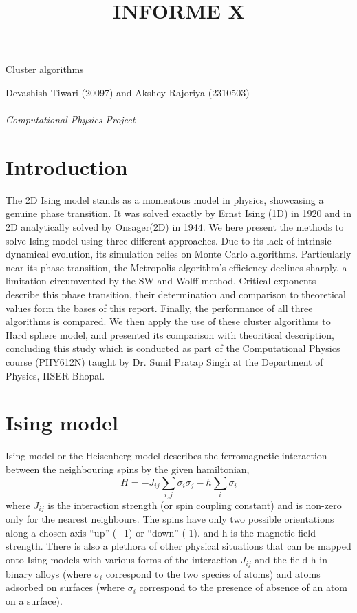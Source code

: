 \documentclass[a4paper,8pt]{article}
\title{INFORME X}
\begin{document}
\begin{center}
\Huge{Cluster algorithms}
\vspace{0.4cm}

\normalsize
\large{Devashish Tiwari (20097) and Akshey Rajoriya (2310503)} \\
\vspace{0.06cm}
\textit{\small{}\\
\large{Computational Physics Project}}\\
\small{}
\end{center}


\section{Introduction}

The 2D Ising model stands as a momentous model in physics, showcasing a genuine phase transition. It was solved exactly by Ernst Ising (1D) in 1920 and in 2D analytically solved by Onsager(2D) \supercite{PhysRev.65.117} in 1944. We here present the methods to solve Ising model using three different approaches. Due to its lack of intrinsic dynamical evolution, its simulation relies on Monte Carlo algorithms. Particularly near its phase transition, the Metropolis algorithm's efficiency declines sharply, a limitation circumvented by the SW and Wolff method. Critical exponents describe this phase transition, their determination and comparison to theoretical values form the bases of this report. Finally, the performance of all three algorithms is compared. We then apply the use of these cluster algorithms to Hard sphere model, and presented its comparison with theoritical description, concluding this study which is conducted as part of the Computational Physics course (PHY612N) taught by Dr. Sunil Pratap Singh at the Department of Physics, IISER Bhopal.


\section{Ising model}
Ising model or the Heisenberg model describes the ferromagnetic interaction between the neighbouring spins by the given hamiltonian,
\begin{equation}
    H = - J_{ij} \underset{i,j}{\sum} \sigma_{i} \sigma_{j} - h \underset{i}{\sum} \sigma_{i}
\end{equation}
where $J_{ij}$ is the interaction strength (or spin coupling constant) and is non-zero only for the nearest neighbours. The spins have only two possible orientations along a chosen axis \enquote{up} (+1) or \enquote{down} (-1). and h is the magnetic field strength. There is also a plethora of other physical situations that can be mapped onto Ising models with various forms of the interaction $J_{ij}$ and the field h in binary alloys (where $\sigma_{i}$ correspond to the two species of atoms) and atoms adsorbed on surfaces (where $\sigma_{i}$ correspond to the presence of absence of an atom on a surface).
\end{document}
